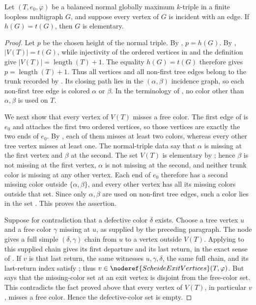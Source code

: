 \begin{lemma}
Let $(T,e_0,\varphi)$ be a balanced normal globally maximum $k$-triple in
a finite loopless multigraph $G$, and suppose every vertex of $G$ is
incident with an edge.  If $h(G)=t(G)$, then $G$ is elementary.
\end{lemma}
\begin{proof}
Let $p$ be the chosen height of the normal triple.  By
, $p=h(G)$.  By
, $|V(T)|=t(G)$, while injectivity of the
ordered vertices in  and the definition
 give $|V(T)|=\operatorname{length}(T)+1$.
The equality $h(G)=t(G)$ therefore gives
$p=\operatorname{length}(T)+1$.  Thus all vertices and all non-first tree
edges belong to the trunk recorded by .
Its closing path lies in the $(\alpha,\beta)$ incidence graph, so each
non-first tree edge is colored $\alpha$ or $\beta$.  In the terminology of
, no color other than $\alpha,\beta$ is used on
$T$.

We next show that every vertex of $V(T)$ misses a free color.  The first
edge of  is $e_0$ and attaches the first two ordered
vertices, so those vertices are exactly the two ends of $e_0$.  By
, each of them misses at least
two colors, whereas every other tree vertex misses at least one.  The
normal-triple data say that $\alpha$ is missing at the first vertex and
$\beta$ at the second.  The set $V(T)$ is elementary by
; hence $\beta$ is not missing at the
first vertex, $\alpha$ is not missing at the second, and neither trunk
color is missing at any other vertex.  Each end of $e_0$ therefore has a
second missing color outside $\{\alpha,\beta\}$, and every other vertex
has all its missing colors outside that set.  Since only
$\alpha,\beta$ are used on non-first tree edges, such a color lies in the
set .  This proves the assertion.

Suppose for contradiction that a defective color $\delta$ exists.  Choose
a tree vertex $u$ and a free color $\gamma$ missing at $u$, as supplied by
the preceding paragraph.  The node
 gives a full simple
$(\delta,\gamma)$ chain from $u$ to a vertex outside $V(T)$.  Applying
 to this supplied chain gives
its first departure and its last return, in the exact sense of
.  If $v$ is that last return, the same
witnesses $u,\gamma,\delta$, the same full chain, and its last-return index
satisfy ; thus
$v\in\noderef{ScheideExitVertices}(T,\varphi)$.  But
 says that the missing-color set at an exit
vertex is disjoint from the free-color set.  This contradicts the fact
proved above that every vertex of $V(T)$, in particular $v$, misses a free
color.  Hence the defective-color set is empty.


\end{proof}
